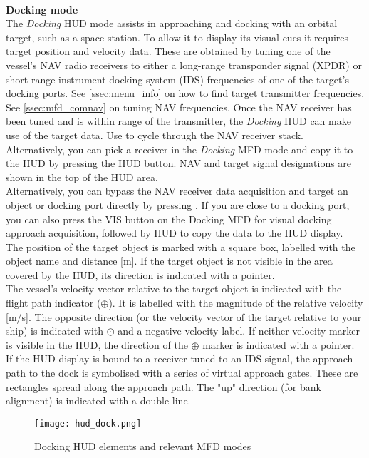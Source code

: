 \documentclass[Orbiter User Manual.tex]{subfiles}
\begin{document}
\noindent
\\
\textbf{Docking mode}\\
The \textit{Docking} HUD mode assists in approaching and docking with an orbital target, such as a space station. To allow it to display its visual cues it requires target position and velocity data. These are obtained by tuning one of the vessel's NAV radio receivers to either a long-range transponder signal (XPDR) or short-range instrument docking system (IDS) frequencies of one of the target's docking ports. See \ref{ssec:menu_info} on how to find target transmitter frequencies. See \ref{ssec:mfd_comnav} on tuning NAV frequencies. Once the NAV receiver has been tuned and is within range of the transmitter, the \textit{Docking} HUD can make use of the target data. Use \Ctrl{} to cycle through the NAV receiver stack. Alternatively, you can pick a receiver in the \textit{Docking} MFD mode and copy it to the HUD by pressing the HUD button. NAV and target signal designations are shown in the top of the HUD area.\\
Alternatively, you can bypass the NAV receiver data acquisition and target an object or docking port directly by pressing \Ctrl\Alt{}. If you are close to a docking port, you can also press the VIS button on the Docking MFD for visual docking approach acquisition, followed by HUD to copy the data to the HUD display.\\
The position of the target object is marked with a square box, labelled with the object name and distance [m]. If the target object is not visible in the area covered by the HUD, its direction is indicated with a pointer.\\
The vessel's velocity vector relative to the target object is indicated with the flight path indicator ($\oplus$). It is labelled with the magnitude of the relative velocity [m/s]. The opposite direction (or the velocity vector of the target relative to your ship) is indicated with $\odot$ and a negative velocity label. If neither velocity marker is visible in the HUD, the direction of the $\oplus$ marker is indicated with a pointer.\\
If the HUD display is bound to a receiver tuned to an IDS signal, the approach path to the dock is symbolised with a series of virtual approach gates. These are rectangles spread along the approach path. The "up" direction (for bank alignment) is indicated with a double line.

\begin{figure}[H]
  \centering
  \texttt{[image: hud\_dock.png]}
  \caption{Docking HUD elements and relevant MFD modes}
\end{figure}
\end{document}
